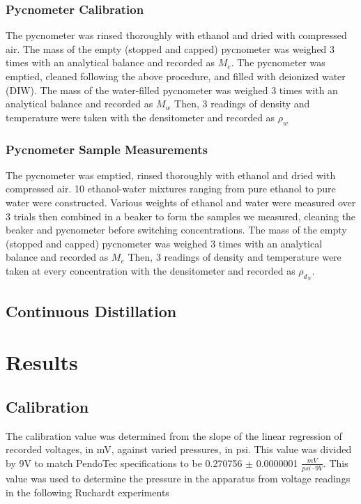 \documentclass[lettersize,journal]{IEEEtran}
\begin{document}
	\subsubsection{Pycnometer Calibration}
	The pycnometer was rinsed thoroughly with ethanol and dried with compressed air. The mass of the empty (stopped and capped) pycnometer was weighed 3 times with an analytical balance and recorded as $M_{e}$. 
	The pycnometer was emptied, cleaned following the above procedure, and filled with deionized water (DIW). The mass of the water-filled pycnometer was weighed 3 times with an analytical balance and recorded as $M_{w}$ Then, 3 readings of density and temperature were taken with the densitometer and recorded as $\rho_{w}$
	\subsubsection{Pycnometer Sample Measurements}
	The pycnometer was emptied, rinsed thoroughly with ethanol and dried with compressed air. 10 ethanol-water mixtures ranging from pure ethanol to pure water were constructed. Various weights of ethanol and water were measured over 3 trials then combined in a beaker to form the samples we measured, cleaning the beaker and pycnometer before switching concentrations. The mass of the empty (stopped and capped) pycnometer was weighed 3 times with an analytical balance and recorded as $M_{e}$ Then, 3 readings of density and temperature were taken at every concentration with the densitometer and recorded as $\rho_{d_N}$.
	\subsection{Continuous Distillation}
	\section{Results}
	\subsection{Calibration}
	The calibration value was determined from the slope of the linear regression of recorded voltages, in mV, against varied pressures, in psi. This value was divided by 9V to match PendoTec specifications  to be 0.270756 $\pm$ 0.0000001 $\frac{mV}{psi\cdot9V}$. This value was used to determine the pressure in the apparatus from voltage readings in the following Ruchardt experiments
	
\end{document}
